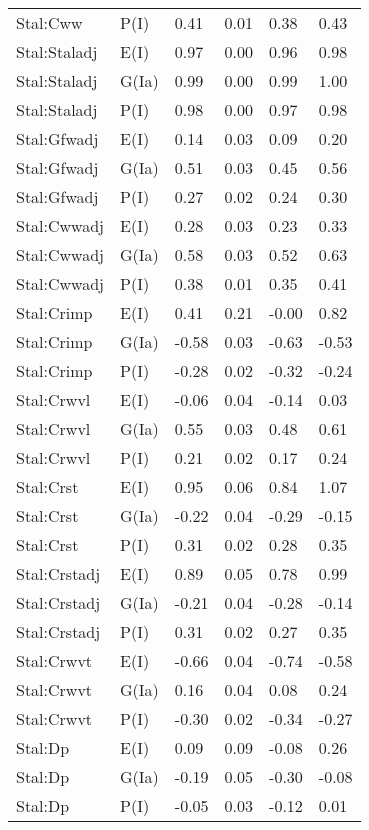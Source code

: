 \begin{center}
\begin{longtable}{|p{1.1in}|p{0.7in}|p{0.7in}|p{0.6in}|p{0.6in}|p{0.6in}|}
  Stal:Cww & P(I) & 0.41 & 0.01 & 0.38 & 0.43 \\ 
  Stal:Staladj & E(I) & 0.97 & 0.00 & 0.96 & 0.98 \\ 
  Stal:Staladj & G(Ia) & 0.99 & 0.00 & 0.99 & 1.00 \\ 
  Stal:Staladj & P(I) & 0.98 & 0.00 & 0.97 & 0.98 \\ 
  Stal:Gfwadj & E(I) & 0.14 & 0.03 & 0.09 & 0.20 \\ 
  Stal:Gfwadj & G(Ia) & 0.51 & 0.03 & 0.45 & 0.56 \\ 
  Stal:Gfwadj & P(I) & 0.27 & 0.02 & 0.24 & 0.30 \\ 
  Stal:Cwwadj & E(I) & 0.28 & 0.03 & 0.23 & 0.33 \\ 
  Stal:Cwwadj & G(Ia) & 0.58 & 0.03 & 0.52 & 0.63 \\ 
  Stal:Cwwadj & P(I) & 0.38 & 0.01 & 0.35 & 0.41 \\ 
  Stal:Crimp & E(I) & 0.41 & 0.21 & -0.00 & 0.82 \\ 
  Stal:Crimp & G(Ia) & -0.58 & 0.03 & -0.63 & -0.53 \\ 
  Stal:Crimp & P(I) & -0.28 & 0.02 & -0.32 & -0.24 \\ 
  Stal:Crwvl & E(I) & -0.06 & 0.04 & -0.14 & 0.03 \\ 
  Stal:Crwvl & G(Ia) & 0.55 & 0.03 & 0.48 & 0.61 \\ 
  Stal:Crwvl & P(I) & 0.21 & 0.02 & 0.17 & 0.24 \\ 
  Stal:Crst & E(I) & 0.95 & 0.06 & 0.84 & 1.07 \\ 
  Stal:Crst & G(Ia) & -0.22 & 0.04 & -0.29 & -0.15 \\ 
  Stal:Crst & P(I) & 0.31 & 0.02 & 0.28 & 0.35 \\ 
  Stal:Crstadj & E(I) & 0.89 & 0.05 & 0.78 & 0.99 \\ 
  Stal:Crstadj & G(Ia) & -0.21 & 0.04 & -0.28 & -0.14 \\ 
  Stal:Crstadj & P(I) & 0.31 & 0.02 & 0.27 & 0.35 \\ 
  Stal:Crwvt & E(I) & -0.66 & 0.04 & -0.74 & -0.58 \\ 
  Stal:Crwvt & G(Ia) & 0.16 & 0.04 & 0.08 & 0.24 \\ 
  Stal:Crwvt & P(I) & -0.30 & 0.02 & -0.34 & -0.27 \\ 
  Stal:Dp & E(I) & 0.09 & 0.09 & -0.08 & 0.26 \\ 
  Stal:Dp & G(Ia) & -0.19 & 0.05 & -0.30 & -0.08 \\ 
  Stal:Dp & P(I) & -0.05 & 0.03 & -0.12 & 0.01 \\ 

\end{longtable}
\end{center}
